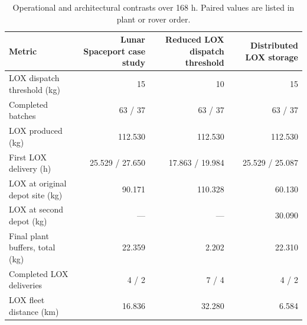 \begin{table}
\centering
\caption{Operational and architectural contrasts over 168 h. Paired values are listed in plant or rover order.}
\label{tab:spaceport-contrasts}
\begin{tabular}{lrrr}
\hline
Metric & Lunar Spaceport case study & Reduced LOX dispatch threshold & Distributed LOX storage \\
\hline
LOX dispatch threshold (kg) & 15 & 10 & 15 \\
Completed batches & 63 / 37 & 63 / 37 & 63 / 37 \\
LOX produced (kg) & 112.530 & 112.530 & 112.530 \\
First LOX delivery (h) & 25.529 / 27.650 & 17.863 / 19.984 & 25.529 / 25.087 \\
LOX at original depot site (kg) & 90.171 & 110.328 & 60.130 \\
LOX at second depot (kg) & --- & --- & 30.090 \\
Final plant buffers, total (kg) & 22.359 & 2.202 & 22.310 \\
Completed LOX deliveries & 4 / 2 & 7 / 4 & 4 / 2 \\
LOX fleet distance (km) & 16.836 & 32.280 & 6.584 \\
\hline
\end{tabular}
\end{table}
